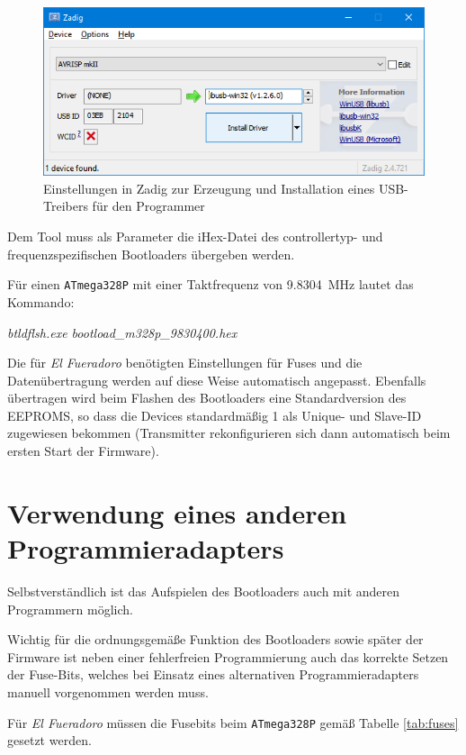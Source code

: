 \documentclass[paper=a4, parskip, numbers=noenddot, toc=listof, headsepline]{scrbook}
\newcommand{\anlage}{\emph{El Fueradoro}}
\begin{document}
			\begin{figure}
				\centering
				\includegraphics[width=.7\textwidth]{Bilder/zadig}
				\caption{Einstellungen in Zadig zur Erzeugung und Installation eines USB-Treibers für den Programmer}
				\label{fig:zadig}
			\end{figure}
			
			Dem Tool muss als Parameter die iHex-Datei des controllertyp- und frequenzspezifischen Bootloaders übergeben werden.

			Für einen \texttt{ATmega328P} mit einer Taktfrequenz von \SI{9,8304}{\mega\hertz} lautet das Kommando:

			\begin{center}
				\emph{btldflsh.exe bootload\_m328p\_9830400.hex}
			\end{center}

			Die für {\anlage} benötigten Einstellungen für Fuses und die Datenübertragung werden auf diese Weise automatisch angepasst. Ebenfalls übertragen wird beim Flashen des Bootloaders eine Standardversion des EEPROMS, so dass die Devices standardmäßig 1 als Unique- und Slave-ID zugewiesen bekommen (Transmitter rekonfigurieren sich dann automatisch beim ersten Start der Firmware).

		\section{Verwendung eines anderen Programmieradapters}

			Selbstverständlich ist das Aufspielen des Bootloaders auch mit anderen Programmern möglich.

			Wichtig für die ordnungsgemäße Funktion des Bootloaders sowie später der Firmware ist neben einer fehlerfreien Programmierung auch das korrekte Setzen der Fuse-Bits, welches bei Einsatz eines alternativen Programmieradapters manuell vorgenommen werden muss.

			Für {\anlage} müssen die Fusebits beim \texttt{ATmega328P} gemäß Tabelle \ref{tab:fuses} gesetzt werden.
\end{document}
